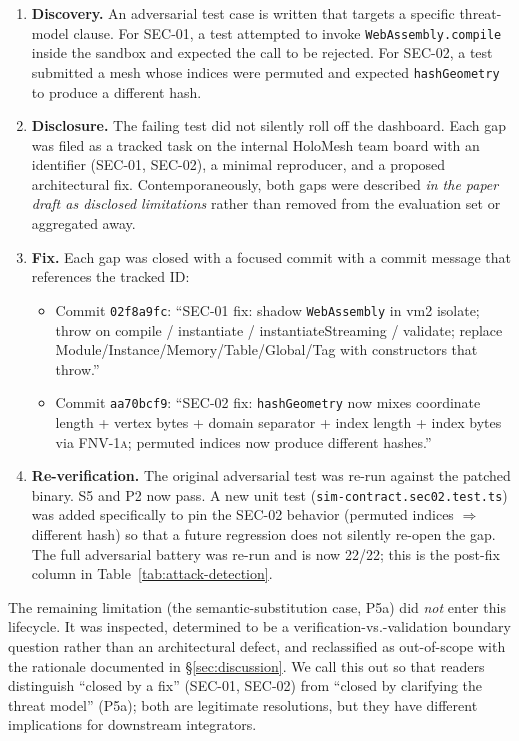 \documentclass[letterpaper,twocolumn,10pt]{article}
\newcommand{\fnvhash}{\textsc{FNV-1a}}
\begin{document}
\begin{enumerate}[leftmargin=*,topsep=2pt,itemsep=3pt]
  \item \textbf{Discovery.} An adversarial test case is written that
    targets a specific threat-model clause. For SEC-01, a test attempted
    to invoke \texttt{WebAssembly.compile} inside the sandbox and
    expected the call to be rejected. For SEC-02, a test submitted a
    mesh whose indices were permuted and expected
    \texttt{hashGeometry} to produce a different hash.
  \item \textbf{Disclosure.} The failing test did not silently roll off
    the dashboard. Each gap was filed as a tracked task on the internal
    HoloMesh team board with an identifier (SEC-01, SEC-02), a
    minimal reproducer, and a proposed architectural fix.
    Contemporaneously, both gaps were described \emph{in the paper
    draft as disclosed limitations} rather than removed from the
    evaluation set or aggregated away.
  \item \textbf{Fix.} Each gap was closed with a focused commit with
    a commit message that references the tracked ID:
    \begin{itemize}[leftmargin=*,topsep=1pt,itemsep=1pt]
      \item Commit \texttt{02f8a9fc}: ``SEC-01 fix: shadow
        \texttt{WebAssembly} in vm2 isolate; throw on compile /
        instantiate / instantiateStreaming / validate; replace
        Module/Instance/Memory/Table/Global/Tag with constructors
        that throw.''
      \item Commit \texttt{aa70bcf9}: ``SEC-02 fix:
        \texttt{hashGeometry} now mixes coordinate length + vertex
        bytes + domain separator + index length + index bytes via
        \fnvhash{}; permuted indices now produce different hashes.''
    \end{itemize}
  \item \textbf{Re-verification.} The original adversarial test was
    re-run against the patched binary. S5 and P2 now pass. A new
    unit test (\texttt{sim-contract.sec02.test.ts}) was added
    specifically to pin the SEC-02 behavior (permuted indices
    $\Rightarrow$ different hash) so that a future regression does
    not silently re-open the gap. The full adversarial battery was
    re-run and is now 22/22; this is the post-fix column in
    Table~\ref{tab:attack-detection}.
\end{enumerate}

The remaining limitation (the semantic-substitution case, P5a) did
\emph{not} enter this lifecycle. It was inspected, determined to be a
verification-vs.-validation boundary question rather than an
architectural defect, and reclassified as out-of-scope with the
rationale documented in \S\ref{sec:discussion}. We call this out so
that readers distinguish ``closed by a fix'' (SEC-01, SEC-02) from
``closed by clarifying the threat model'' (P5a); both are legitimate
resolutions, but they have different implications for downstream
integrators.
\end{document}
